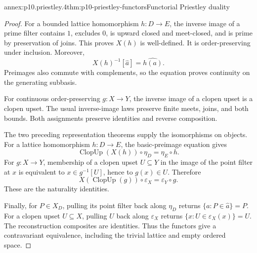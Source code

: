 \begin{annexitem}{annex:p10.priestley.4}{thm:p10-priestley-functors}{Functorial Priestley duality}
\begin{proof}
For a bounded lattice homomorphism \(h:D\to E\), the inverse
image of a prime filter contains \(1\), excludes \(0\), is
upward closed and meet-closed, and is prime by preservation of joins.
This proves \(X(h)\) is well-defined.
It is order-preserving under inclusion.
Moreover,
\[
 X(h)^{-1}[\widehat a]=\widehat{h(a)}.
\]
Preimages also commute with complements, so the equation proves
continuity on the generating subbasis.

For continuous order-preserving \(g:X\to Y\), the inverse image
of a clopen upset is a clopen upset.
The usual inverse-image laws preserve finite meets, joins,
and both bounds.
Both assignments preserve identities and reverse composition.

The two preceding representation theorems supply the isomorphisms
on objects.
For a lattice homomorphism \(h:D\to E\), the basic-preimage
equation gives
\[
 \operatorname{ClopUp}(X(h))\circ\eta_D=\eta_E\circ h.
\]
For \(g:X\to Y\), membership of a clopen upset \(U\subseteq Y\)
in the image of the point filter at \(x\) is equivalent to
\(x\in g^{-1}[U]\), hence to \(g(x)\in U\).
Therefore
\[
 X(\operatorname{ClopUp}(g))\circ\varepsilon_X
       =\varepsilon_Y\circ g.
\]
These are the naturality identities.

Finally, for \(P\in X_D\), pulling its point filter back along
\(\eta_D\) returns
\(\{a:P\in\widehat a\}=P\).
For a clopen upset \(U\subseteq X\), pulling \(\widehat U\)
back along \(\varepsilon_X\) returns
\(\{x:U\in\varepsilon_X(x)\}=U\).
The reconstruction composites are identities.
Thus the functors give a contravariant equivalence, including
the trivial lattice and empty ordered space.
\end{proof}
\end{annexitem}
